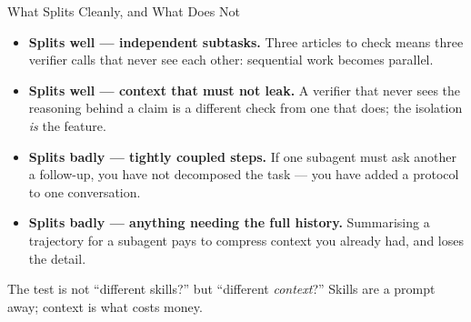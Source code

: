 \begin{frame}{What Splits Cleanly, and What Does Not}
\begin{itemize}
  \item \textbf{Splits well --- independent subtasks.} Three articles to check means three verifier calls that never see each other: sequential work becomes parallel.
  \pause
  \item \textbf{Splits well --- context that must not leak.} A verifier that never sees the reasoning behind a claim is a different check from one that does; the isolation \emph{is} the feature.
  \pause
  \item \textbf{Splits badly --- tightly coupled steps.} If one subagent must ask another a follow-up, you have not decomposed the task --- you have added a protocol to one conversation.
  \pause
  \item \textbf{Splits badly --- anything needing the full history.} Summarising a trajectory for a subagent pays to compress context you already had, and loses the detail.
\end{itemize}
\pause
\begin{rlintuition}
The test is not ``different skills?'' but ``different \emph{context}?'' Skills are a prompt away; context is what costs money.
\end{rlintuition}
\end{frame}

